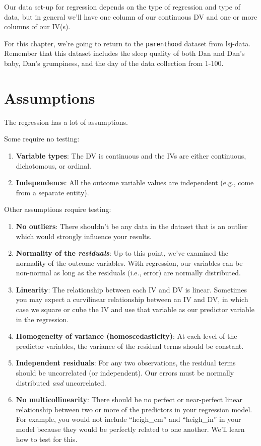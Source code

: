 \documentclass[
]{book}
\begin{document}
Our data set-up for regression depends on the type of regression and type of data, but in general we'll have one column of our continuous DV and one or more columns of our IV(s).

For this chapter, we're going to return to the \texttt{parenthood} dataset from lsj-data. Remember that this dataset includes the sleep quality of both Dan and Dan's baby, Dan's grumpiness, and the day of the data collection from 1-100.

\hypertarget{assumptions-6}{%
\section{Assumptions}\label{assumptions-6}}

The regression has a lot of assumptions.

Some require no testing:

\begin{enumerate}
\def\labelenumi{\arabic{enumi}.}
\item
  \textbf{Variable types}: The DV is continuous and the IVs are either continuous, dichotomous, or ordinal.
\item
  \textbf{Independence}: All the outcome variable values are independent (e.g., come from a separate entity).
\end{enumerate}

Other assumptions require testing:

\begin{enumerate}
\def\labelenumi{\arabic{enumi}.}
\item
  \textbf{No outliers}: There shouldn't be any data in the dataset that is an outlier which would strongly influence your results.
\item
  \textbf{Normality of the \emph{residuals}}: Up to this point, we've examined the normality of the outcome variables. With regression, our variables can be non-normal as long as the residuals (i.e., error) are normally distributed.
\item
  \textbf{Linearity}: The relationship between each IV and DV is linear. Sometimes you may expect a curvilinear relationship between an IV and DV, in which case we square or cube the IV and use that variable as our predictor variable in the regression.
\item
  \textbf{Homogeneity of variance (homoscedasticity)}: At each level of the predictor variables, the variance of the residual terms should be constant.
\item
  \textbf{Independent residuals}: For any two observations, the residual terms should be uncorrelated (or independent). Our errors must be normally distributed \emph{and} uncorrelated.
\item
  \textbf{No multicollinearity}: There should be no perfect or near-perfect linear relationship between two or more of the predictors in your regression model. For example, you would not include ``heigh\_cm'' and ``heigh\_in'' in your model because they would be perfectly related to one another. We'll learn how to test for this.
\end{enumerate}
\end{document}
